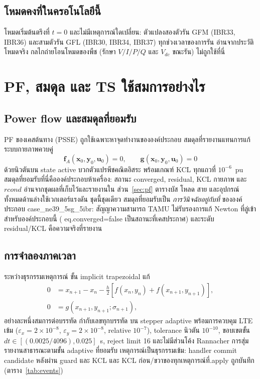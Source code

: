 \documentclass[12pt,a4paper]{article}
\newcommand{\code}[1]{{\ttfamily\small\hyphenchar\font=-1 #1}}
\newcommand{\vect}[1]{\boldsymbol{#1}}
\begin{document}
\subsection{โหมดคงที่ในครอโนโลยีนี้}

โหมดเริ่มต้นตรึงที่ $t=0$ และไม่มีเหตุการณ์ใดเปลี่ยน: ตัวแปลงสองตัวรัน GFM
(IBR33, IBR36) และสามตัวรัน GFL (IBR30, IBR34, IBR37) ทุกช่วงเวลาของการรัน
อ่านจากประวัติโหมดจริง กลไกถ่ายโอนโหมดของพืช (รักษา $V/I/P/Q$ และ $V_{dc}$
ขณะรัน) ไม่ถูกใช้ที่นี่

\section{PF, สมดุล และ TS ใช้สมการอย่างไร}\label{sec:tsform}

\subsection{Power flow และสมดุลที่ยอมรับ}

PF ของเคสต้นทาง (PSSE) ถูกใช้เฉพาะหาจุดทำงานขององค์ประกอบ
สมดุลที่รายงานแทนการแก้ระบบกายภาพควบคู่
\[
\vect f_A(\vect x_0,\vect y_0,\vect u_0)=0,\qquad
\vect g(\vect x_0,\vect y_0,\vect u_0)=0
\]
ด้วยนิวตันบน state active บวกตัวแปรพีชคณิตอิสระ พร้อมเกณฑ์ KCL ทุกแถวที่
$10^{-6}$~pu สมดุลที่ยอมรับที่นี่คือองค์ประกอบห้าเครื่อง: สถานะ converged,
residual, KCL กายภาพ และ $rcond$ อ่านจากชุดผลที่เก็บไว้และรายงานใน
ส่วน~\ref{sec:pf} ตารางบัส โหลด สาย และอุปกรณ์ทั้งหมดด้านล่างใช้เวกเตอร์แรงดัน
ชุดนี้ชุดเดียว สมดุลที่ยอมรับเป็น \emph{การวินิจฉัยอยู่กับที่} ขององค์ประกอบ
\code{case\_ne39\_5sg\_5ibr}: สัญญาความสามารถ TAMU ไม่รับรองการแก้ Newton
ที่ลู่เข้าสำหรับองค์ประกอบนี้ (\code{eq.converged=false} เป็นสถานะที่เคสประกาศ)
และระดับ residual/KCL คือความจริงที่รายงาน

\subsection{การจำลองภาคเวลา}

ระหว่างธุรกรรมเหตุการณ์ ขั้น implicit trapezoidal แก้
\begin{align}
0&=x_{n+1}-x_n-\frac{h}{2}\left[f(x_n,y_n)+f(x_{n+1},y_{n+1})\right],\\
0&=g(x_{n+1},y_{n+1};\sigma_{n+1}),
\end{align}
อย่างละหนึ่งสมการต่อบรรทัด กำกับเลขทุกบรรทัด บน stepper \code{adaptive}
พร้อมการควบคุม LTE เข้ม ($\varepsilon_x=2\times10^{-8}$,
$\varepsilon_y=2\times10^{-8}$, relative $10^{-7}$), tolerance นิวตัน
$10^{-10}$, ขอบเขตขั้น $dt\in[(0.0025/4096),0.025]$~s, reject limit 16
และไม่มีส่วนโค้ง Rannacher การสุ่มรายงานสาธารณะตามขั้น adaptive ที่ยอมรับ
เหตุการณ์เป็นธุรกรรมเข้ม: handler commit candidate หลังผ่าน guard และ KCL
และ KCL ก่อน/ขวาของทุกเหตุการณ์ที่.apply ถูกบันทึก (ตาราง~\ref{tab:events})
\end{document}
